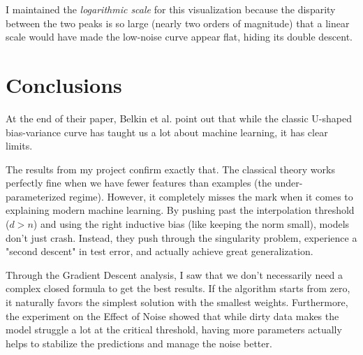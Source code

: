 \documentclass[11pt,a4paper]{article}
\begin{document}
I maintained the \textit{logarithmic scale} for this visualization because the disparity between the two peaks is so large (nearly two orders of magnitude) that a linear scale would have made the low-noise curve appear flat, hiding its double descent.

\section{Conclusions}

At the end of their paper, Belkin et al. point out that while the classic U-shaped bias-variance curve has taught us a lot about machine learning, it has clear limits.

The results from my project confirm exactly that. The classical theory works perfectly fine when we have fewer features than examples (the under-parameterized regime). However, it completely misses the mark when it comes to explaining modern machine learning. By pushing past the interpolation threshold ($d > n$) and using the right inductive bias (like keeping the norm small), models don't just crash. Instead, they push through the singularity problem, experience a "second descent" in test error, and actually achieve great generalization.

Through the Gradient Descent analysis, I saw that we don't necessarily need a complex closed formula to get the best results. If the algorithm starts from zero, it naturally favors the simplest solution with the smallest weights. Furthermore, the experiment on the Effect of Noise showed that while dirty data makes the model struggle a lot at the critical threshold, having more parameters actually helps to stabilize the predictions and manage the noise better.


\end{document}
